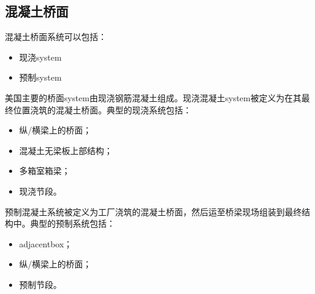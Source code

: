 \subsection{混凝土桥面}
混凝土桥面系统可以包括：
\begin{itemize}
  \item 现浇\gls*{system}
  \item 预制\gls*{system}
\end{itemize}

美国主要的桥面\gls*{system}由现浇钢筋混凝土组成。现浇混凝土\gls*{system}被定义为在其最终位置浇筑的混凝土桥面。典型的现浇系统包括：
\begin{itemize}
  \item 纵/横梁上的桥面；
  \item 混凝土无梁板上部结构；
  \item 多箱室箱梁；
  \item 现浇节段。
\end{itemize}

预制混凝土系统被定义为工厂浇筑的混凝土桥面，然后运至桥梁现场组装到最终结构中。典型的预制系统包括：
\begin{itemize}
  \item \gls*{adjacentbox}；
  \item 纵/横梁上的桥面；
  \item 预制节段。
\end{itemize}

